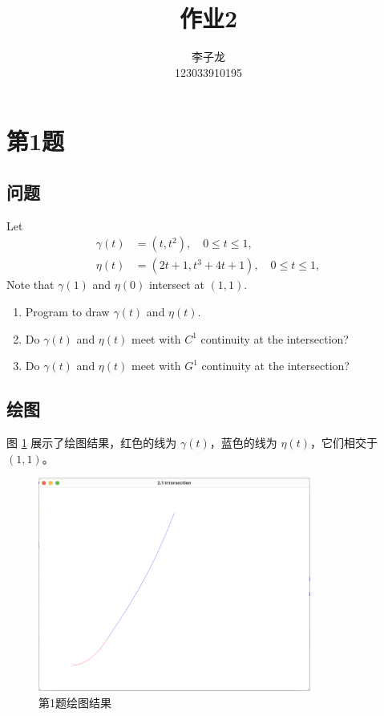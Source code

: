 \documentclass[math-font=newcm]{sjtuarticle}
\title{作业2}
\author{李子龙\\123033910195}
\begin{document}
\maketitle

\tableofcontents*
\clearpage

\section{第1题}

\subsection{问题}
Let
\begin{align*}
    \gamma(t)&=(t,t^2),\quad 0\leq t\leq 1,\\
    \eta(t)&=(2t+1,t^3+4t+1),\quad 0\leq t\leq 1,
\end{align*}
Note that $\gamma(1)$ and $\eta(0)$ intersect at $(1,1)$.
\begin{enumerate}
    \item Program to draw $\gamma(t)$ and $\eta(t)$.
    \item Do $\gamma(t)$ and $\eta(t)$ meet with $C^1$ continuity at the intersection?
    \item Do $\gamma(t)$ and $\eta(t)$ meet with $G^1$ continuity at the intersection?
\end{enumerate}

\subsection{绘图}

图 \ref{fig:p1} 展示了绘图结果，红色的线为 $\gamma(t)$，蓝色的线为 $\eta(t)$，它们相交于 $(1,1)$。

\begin{figure}[h]
    \centering
    \includegraphics[width=0.8\textwidth]{p1.png}
    \caption{第1题绘图结果}
    \label{fig:p1}
\end{figure}
\end{document}
